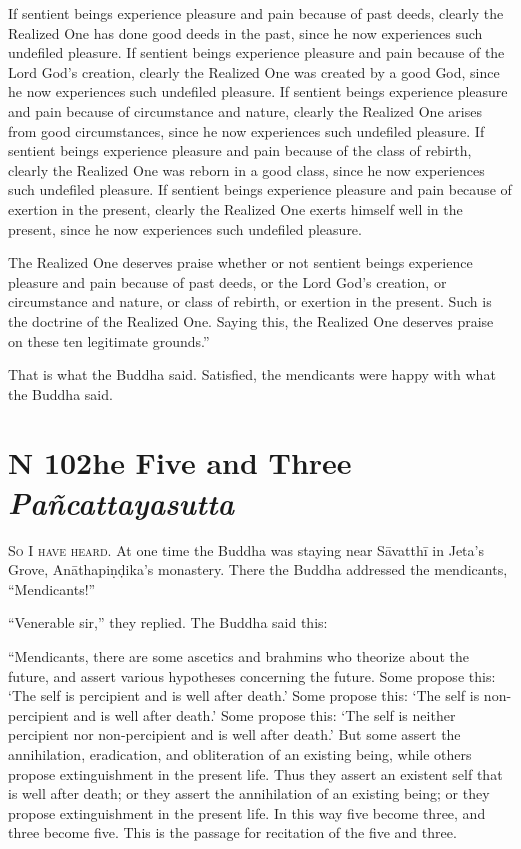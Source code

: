 \documentclass[12pt,openany]{book}%
\newcommand*{\suttatitleacronym}[1]{\smaller[2]{#1}\vspace*{.3em}}
\newcommand*{\suttatitletranslation}[1]{\linebreak{#1}}
\newcommand*{\suttatitleroot}[1]{\linebreak\smaller[2]\itshape{#1}}
\newcommand*{\tocacronym}[1]{\hspace*{-3.3em}{#1}\quad}
\newcommand*{\toctranslation}[1]{#1}
\newcommand*{\tocroot}[1]{(\textit{#1})}
\newcommand*{\scevam}[1]{\textsc{#1}}
\begin{document}
If sentient beings experience pleasure and pain because of past deeds, clearly the Realized One has done good deeds in the past, since he now experiences such undefiled pleasure. If sentient beings experience pleasure and pain because of the Lord God’s creation, clearly the Realized One was created by a good God, since he now experiences such undefiled pleasure. If sentient beings experience pleasure and pain because of circumstance and nature, clearly the Realized One arises from good circumstances, since he now experiences such undefiled pleasure. If sentient beings experience pleasure and pain because of the class of rebirth, clearly the Realized One was reborn in a good class, since he now experiences such undefiled pleasure. If sentient beings experience pleasure and pain because of exertion in the present, clearly the Realized One exerts himself well in the present, since he now experiences such undefiled pleasure. 

The Realized One deserves praise whether or not sentient beings experience pleasure and pain because of past deeds, or the Lord God’s creation, or circumstance and nature, or class of rebirth, or exertion in the present. Such is the doctrine of the Realized One. Saying this, the Realized One deserves praise on these ten legitimate grounds.” 

That is what the Buddha said. Satisfied, the mendicants were happy with what the Buddha said. 

%
\section*{{\suttatitleacronym MN 102}{\suttatitletranslation The Five and Three }{\suttatitleroot Pañcattayasutta}}
\addcontentsline{toc}{section}{\tocacronym{MN 102} \toctranslation{The Five and Three } \tocroot{Pañcattayasutta}}

\scevam{So I have heard. }At one time the Buddha was staying near \textsanskrit{Sāvatthī} in Jeta’s Grove, \textsanskrit{Anāthapiṇḍika}’s monastery. There the Buddha addressed the mendicants, “Mendicants!” 

“Venerable sir,” they replied. The Buddha said this: 

“Mendicants, there are some ascetics and brahmins who theorize about the future, and assert various hypotheses concerning the future. Some propose this: ‘The self is percipient and is well after death.’ Some propose this: ‘The self is non-percipient and is well after death.’ Some propose this: ‘The self is neither percipient nor non-percipient and is well after death.’ But some assert the annihilation, eradication, and obliteration of an existing being, while others propose extinguishment in the present life. Thus they assert an existent self that is well after death; or they assert the annihilation of an existing being; or they propose extinguishment in the present life. In this way five become three, and three become five. This is the passage for recitation of the five and three. 
\end{document}

